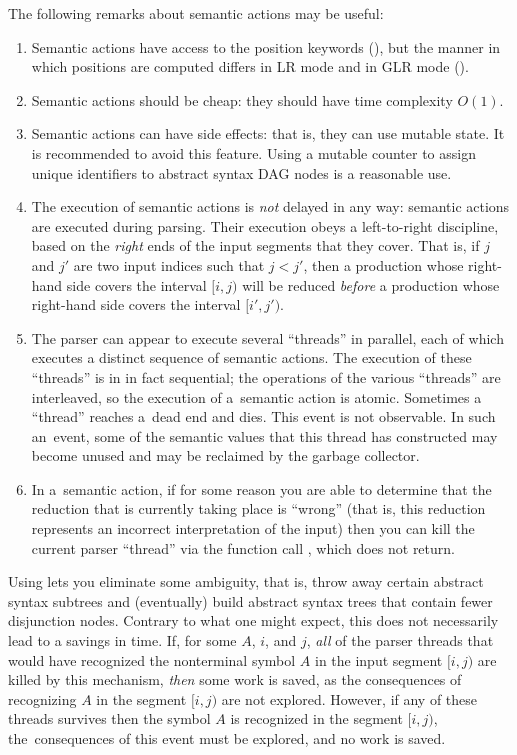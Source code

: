 The following remarks about semantic actions may be useful:
\begin{enumerate}
\item Semantic actions have access to the position keywords (),
      but the manner in which positions are computed
      differs in LR mode and in GLR mode
      ().
\item Semantic actions should be cheap: they should have time complexity $O(1)$.
\item Semantic actions can have side effects:
      that is, they can use mutable state.
      It is recommended to avoid this feature.
      Using a mutable counter to assign unique identifiers
      to abstract syntax DAG nodes is a reasonable use.
\item The execution of semantic actions is \emph{not} delayed in any way:
      semantic actions are executed during parsing.
      Their execution obeys a left-to-right discipline,
      based on the \emph{right} ends of the input segments
      that they cover. That is,
      if $j$ and $j'$ are two input indices
      such that $j < j'$,
      then a production whose right-hand side covers the interval $[i, j)$
      will be reduced \emph{before}
      a production whose right-hand side covers the interval $[i', j')$.
\item The parser can appear to execute several ``threads'' in parallel,
      each of which executes a distinct sequence of semantic actions.
      The execution of these ``threads'' is in in fact sequential;
      the operations of the various ``threads'' are interleaved,
      so the execution of a~semantic action is atomic.
      Sometimes a ``thread'' reaches a~dead end and dies.
      This event is not observable.
      In such an~event, some of the semantic values
      that this thread has constructed
      may become unused and may be reclaimed by the garbage collector.
\item In a~semantic action, if for some reason
      you are able to determine that
      the reduction that is currently taking place is ``wrong''
      (that is, this reduction represents an incorrect interpretation of the input)
      then you can kill the current parser ``thread'' via the function call \callreject,
      which does not return.
\end{enumerate}

Using \callreject lets you eliminate some ambiguity, that is,
throw away certain abstract syntax subtrees and (eventually)
build abstract syntax trees that contain fewer disjunction nodes.
%
Contrary to what one might expect,
this does not necessarily lead to a savings in time.
%
If, for some $A$, $i$, and $j$,
\emph{all} of the parser threads
that would have recognized the nonterminal symbol $A$
in the input segment $[i, j)$
are killed by this mechanism,
\emph{then} some work is saved,
as the consequences of recognizing $A$ in the segment $[i, j)$
are not explored.
%
However, if any of these threads survives
then the symbol $A$ is recognized in the segment $[i, j)$,
the~consequences of this event must be explored,
and no work is saved.

